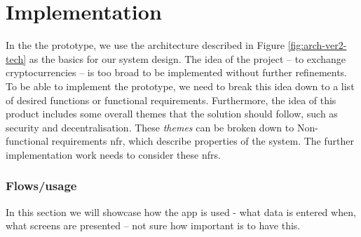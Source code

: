 \section{Implementation}
% 
In the the prototype, we use the architecture described in Figure \ref{fig:arch-ver2-tech} as the basics for our system design. The idea of the project -- to exchange cryptocurrencies -- is too broad to be implemented without further refinements. To be able to implement the prototype, we need to break this idea down to a list of desired functions or functional requirements. Furthermore, the idea of this product includes some overall themes that the solution should follow, such as security and decentralisation. These \textit{themes} can be broken down to Non-functional requirements \acrshort{nfr}, which describe properties of the system. The further implementation work needs to consider these \acrshort{nfr}s.














\subsubsection{Flows/usage}
% 
In this section we will showcase how the app is used - what data is entered when, what screens are presented -- not sure how important is to have this.


